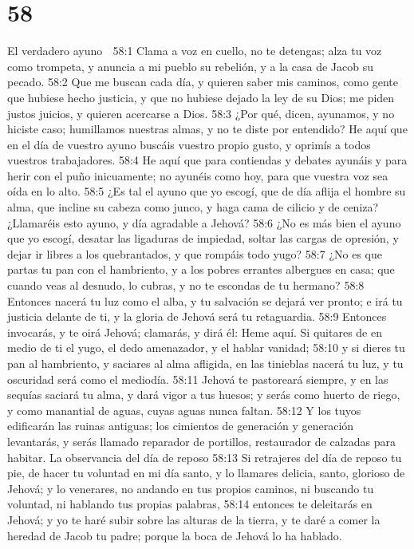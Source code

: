 \chapter{58}

El verdadero ayuno  

58:1 Clama a voz en cuello, no te detengas; alza tu voz como trompeta, y anuncia a mi pueblo su rebelión, y a la casa de Jacob su pecado.  
58:2 Que me buscan cada día, y quieren saber mis caminos, como gente que hubiese hecho justicia, y que no hubiese dejado la ley de su Dios; me piden justos juicios, y quieren acercarse a Dios.  
58:3 ¿Por qué, dicen, ayunamos, y no hiciste caso; humillamos nuestras almas, y no te diste por entendido? He aquí que en el día de vuestro ayuno buscáis vuestro propio gusto, y oprimís a todos vuestros trabajadores.  
58:4 He aquí que para contiendas y debates ayunáis y para herir con el puño inicuamente; no ayunéis como hoy, para que vuestra voz sea oída en lo alto.  
58:5 ¿Es tal el ayuno que yo escogí, que de día aflija el hombre su alma, que incline su cabeza como junco, y haga cama de cilicio y de ceniza? ¿Llamaréis esto ayuno, y día agradable a Jehová?  
58:6 ¿No es más bien el ayuno que yo escogí, desatar las ligaduras de impiedad, soltar las cargas de opresión, y dejar ir libres a los quebrantados, y que rompáis todo yugo?  
58:7 ¿No es que partas tu pan con el hambriento, y a los pobres errantes albergues en casa; que cuando veas al desnudo, lo cubras, y no te escondas de tu hermano?  
58:8 Entonces nacerá tu luz como el alba, y tu salvación se dejará ver pronto; e irá tu justicia delante de ti, y la gloria de Jehová será tu retaguardia.  
58:9 Entonces invocarás, y te oirá Jehová; clamarás, y dirá él: Heme aquí. Si quitares de en medio de ti el yugo, el dedo amenazador, y el hablar vanidad;  
58:10 y si dieres tu pan al hambriento, y saciares al alma afligida, en las tinieblas nacerá tu luz, y tu oscuridad será como el mediodía.  
58:11 Jehová te pastoreará siempre, y en las sequías saciará tu alma, y dará vigor a tus huesos; y serás como huerto de riego, y como manantial de aguas, cuyas aguas nunca faltan.  
58:12 Y los tuyos edificarán las ruinas antiguas; los cimientos de generación y generación levantarás, y serás llamado reparador de portillos, restaurador de calzadas para habitar.  
La observancia del día de reposo  
58:13 Si retrajeres del día de reposo tu pie, de hacer tu voluntad en mi día santo, y lo llamares delicia, santo, glorioso de Jehová; y lo venerares, no andando en tus propios caminos, ni buscando tu voluntad, ni hablando tus propias palabras,  
58:14 entonces te deleitarás en Jehová; y yo te haré subir sobre las alturas de la tierra, y te daré a comer la heredad de Jacob tu padre; porque la boca de Jehová lo ha hablado.  

